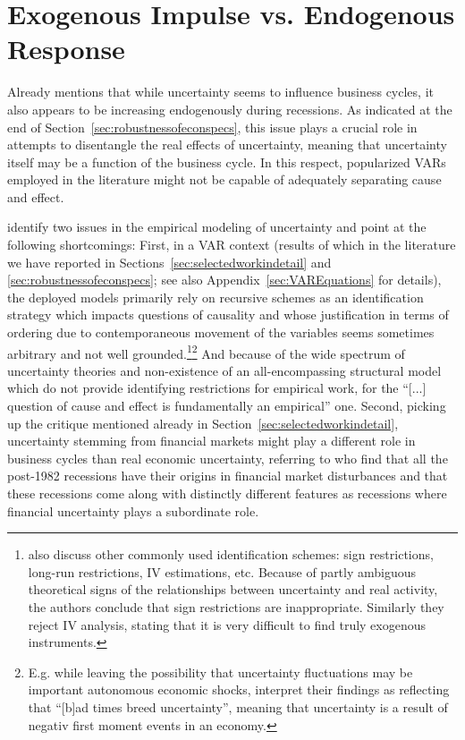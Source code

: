\documentclass[a4paper,11pt,listof=nochaptergap,oneside,pointednumbers,bibtotoc,bigheadings,liststotoc,hidelinks]{scrbook}
\theoremstyle{mysatz}
\theoremstyle{mydefinition}
\theoremstyle{mytheorem}
\theoremstyle{mybemerkung}
\begin{document}
\section{Exogenous Impulse vs. Endogenous Response}
\label{sec:exoEndoJuradoetal}
Already \citet{bloom:14} mentions that while uncertainty seems to influence business cycles, it also appears to be increasing endogenously during recessions. As indicated at the end of Section~\ref{sec:robustnessofeconspecs}, this issue plays a crucial role in attempts to disentangle the real effects of uncertainty, meaning that uncertainty itself may be a function of the business cycle. In this respect, popularized VARs employed in the literature might not be capable of adequately separating cause and effect.

 \citet{ludvigsonetal:19} identify two issues in the empirical modeling of uncertainty and point at the following shortcomings: First, in a VAR context (results of which in the literature we have reported in Sections~\ref{sec:selectedworkindetail} and \ref{sec:robustnessofeconspecs}; see also Appendix~\ref{sec:VAREquations} for details), the deployed models primarily rely on recursive schemes as an identification strategy which impacts questions of causality and whose justification in terms of ordering due to contemporaneous movement of the variables seems sometimes arbitrary and not well grounded.\footnote{\citet{ludvigsonetal:18} also discuss other commonly used identification schemes: sign restrictions, long-run restrictions, IV estimations, etc. Because of partly ambiguous theoretical signs of the relationships between uncertainty and real activity, the authors conclude that sign restrictions are inappropriate. Similarly they reject IV analysis, stating that it is very difficult to find truly exogenous instruments.}\footnote{E.g. while leaving the possibility that uncertainty fluctuations may be important autonomous economic shocks, \citet[p. 28]{bachmannetal:13} interpret their findings as reflecting that ``[b]ad times breed uncertainty'', meaning that uncertainty is a result of negativ first moment events in an economy.} And because of the wide spectrum of uncertainty theories and non-existence of an all-encompassing structural model which do not provide identifying restrictions for empirical work, for \citet[p. 5]{ludvigsonetal:19} the ``[...] question of cause and effect is fundamentally an empirical'' one. Second, picking up the critique mentioned already in Section~\ref{sec:selectedworkindetail}, uncertainty stemming from financial markets might play a different role in business cycles than real economic uncertainty, referring to \citet{ngandwright:13} who find that all the post-1982 recessions have their origins in financial market disturbances and that these recessions come along with distinctly different features as recessions where financial uncertainty plays a subordinate role.\\
\end{document}
